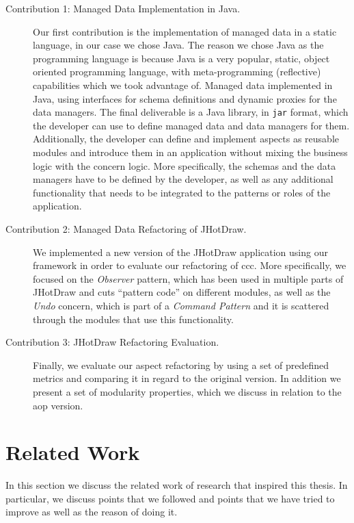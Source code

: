 \begin{description}
  \item[Contribution 1: Managed Data Implementation in Java.]
  Our first contribution is the implementation of managed data in a static language, in our case we chose Java.
  The reason we chose Java as the programming language is because Java is a very popular, static, object oriented programming language, with meta-programming (reflective) capabilities which we took advantage of.
  Managed data implemented in Java, using interfaces for schema definitions and dynamic proxies for the data managers.
  The final deliverable is a Java library, in \texttt{jar} format, which the developer can use to define managed data and data managers for them. 
  Additionally, the developer can define and implement aspects as reusable modules and introduce them in an application without mixing the business logic with the concern logic. 
  More specifically, the schemas and the data managers have to be defined by the developer, as well as any additional functionality that needs to be integrated to the patterns or roles of the application.

  \item[Contribution 2: Managed Data Refactoring of JHotDraw.]
  We implemented a new version of the JHotDraw application using our framework in order to evaluate our refactoring of \ac{ccc}.
  More specifically, we focused on the \textit{Observer} pattern, which has been used in multiple parts of JHotDraw and cuts ``pattern code'' on different modules, as well as the \textit{Undo} concern, which is part of a \textit{Command Pattern} and it is scattered through the modules that use this functionality.

  \item[Contribution 3: JHotDraw Refactoring Evaluation.]
  Finally, we evaluate our aspect refactoring by using a set of predefined metrics and comparing it in regard to the original version.
  In addition we present a set of modularity properties, which we discuss in relation to the \ac{aop} version.
\end{description}

\section{Related Work}\label{Related Work}
In this section we discuss the related work of research that inspired this thesis.
In particular, we discuss points that we followed and points that we have tried to improve as well as the reason of doing it.

